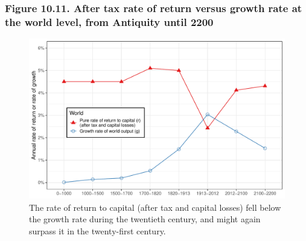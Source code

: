 \documentclass[t]{beamer}\usepackage[]{graphicx}\usepackage[]{color}
\newenvironment{knitrout}{}{} %
\begin{document}
\begin{frame}[label=Figure_10_11]
\frametitle{Figure 10.11. After tax rate of return versus growth rate at the world level, from Antiquity until 2200}
\begin{figure}[t]
\begin{minipage}[b]{\textwidth}
\centering
\begin{knitrout}\footnotesize
{}\color{fgcolor}

{\centering \includegraphics[width=1\linewidth]{figures/color/Figure_10_11} 

}



\end{knitrout}
\caption{The rate of return to capital (after tax and capital losses) fell below the growth rate during the twentieth century, and might again surpass it in the twenty-first century.}
\end{minipage}
\end{figure}
\end{frame}
\end{document}
